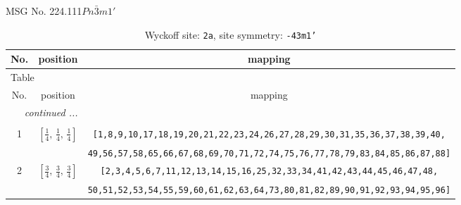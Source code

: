 \documentclass[fleqn,8pt]{jsarticle}
\begin{document}
\setcounter{MaxMatrixCols}{32}

\renewcommand{\tablename}{Table~}
\renewcommand{\figurename}{Figure~}
\begin{center}
\LARGE
MSG No. 224.111\quad$Pn\bar{3}m1'$
\end{center}
\renewcommand{\arraystretch}{1.2}
\begin{longtable}{ccc}
\caption{Wyckoff site: {\tt 2a}, site symmetry: {\tt -43m1'}}
 \\
 \hline \hline
No. & position & mapping \\ \hline \endfirsthead

\multicolumn{2}{l}{\tablename\ \thetable{}} \\
 \hline \hline
No. & position & mapping \\ \hline \endhead

 \hline \hline
\multicolumn{2}{r}{\footnotesize\it continued ...} \\ \endfoot

 \hline \hline
\multicolumn{2}{r}{} \\ \endlastfoot

1 & $\left[ \frac{1}{4},\, \frac{1}{4},\, \frac{1}{4} \right]$ & {\tt [1,8,9,10,17,18,19,20,21,22,23,24,26,27,28,29,30,31,35,36,37,38,39,40,} \\ \hline
 &  & {\tt 49,56,57,58,65,66,67,68,69,70,71,72,74,75,76,77,78,79,83,84,85,86,87,88]} \\ \hline
2 & $\left[ \frac{3}{4},\, \frac{3}{4},\, \frac{3}{4} \right]$ & {\tt [2,3,4,5,6,7,11,12,13,14,15,16,25,32,33,34,41,42,43,44,45,46,47,48,} \\ \hline
 &  & {\tt 50,51,52,53,54,55,59,60,61,62,63,64,73,80,81,82,89,90,91,92,93,94,95,96]} \\
\end{longtable}
\renewcommand{\arraystretch}{1.2}
\end{document}
